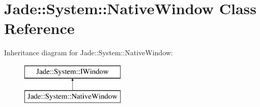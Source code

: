 \hypertarget{class_jade_1_1_system_1_1_native_window}{}\section{Jade\+:\+:System\+:\+:Native\+Window Class Reference}
\label{class_jade_1_1_system_1_1_native_window}
Inheritance diagram for Jade\+:\+:System\+:\+:Native\+Window\+:\begin{figure}[H]
\begin{center}
\leavevmode
\includegraphics[height=2.000000cm]{class_jade_1_1_system_1_1_native_window}
\end{center}
\end{figure}
